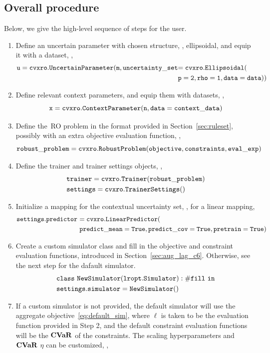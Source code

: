 \subsection{Overall procedure}
\label{sec:user_steps}
Below, we give the high-level sequence of steps for the user. 
{\begin{singlespace}
\begin{enumerate}
  \item Define an uncertain parameter with chosen structure, \eg, ellipsoidal, and equip it with a dataset, \eg, 
  \begin{align*}
    \tt{u = cvxro.UncertainParameter(m,uncertainty\_set}&\tt{=cvxro.Ellipsoidal(}\\
    &\tt{p=2,rho = 1, data=data}))
  \end{align*}
  \item Define relevant context parameters, and equip them with datasets, \eg,
$$\tt{x = cvxro.ContextParameter(n, data=context\_data)} $$
  \item Define the~\gls{RO} problem in the format provided in Section~\ref{sec:ruleset}, possibly with an extra objective evaluation function, \eg,
  $$\tt{robust\_problem = cvxro.RobustProblem(objective, constraints, eval\_exp)} $$
  \item Define the trainer and trainer settings objects, \eg,
 \begin{align*}
  & \tt{trainer = cvxro.Trainer(robust\_problem)}\\
  & \tt{settings = cvxro.TrainerSettings()}
 \end{align*}
\item Initialize a mapping for the contextual uncertainty set, \eg, for a linear mapping,
    \begin{align*}
    \tt{settings.predictor}~&\tt{= cvxro.LinearPredictor(}\\
    &\tt{predict\_mean = True, predict\_cov = True, pretrain=True)}
  \end{align*}
\item Create a custom simulator class and fill in the objective and constraint evaluation functions, introduced in Section~\ref{sec:aug_lag_c6}. Otherwise, see the next step for the dafault simulator. 
    \begin{align*}
&\tt{class~NewSimulator(lropt.Simulator): \#fill~in}\\
&\tt{settings.simulator = NewSimulator()}
  \end{align*}
\item If a custom simulator is not provided, the default simulator will use the aggregate objective~\eqref{eq:default_sim}, where $\ell$ is taken to be the evaluation function provided in Step 2, and the default constraint evaluation functions will be the $\mathop{\bf CVaR}$ of the constraints. The scaling hyperparameters and $\mathop{\bf CVaR}$ $\eta$ can be customized, \eg,

\end{enumerate}
\end{singlespace}}
